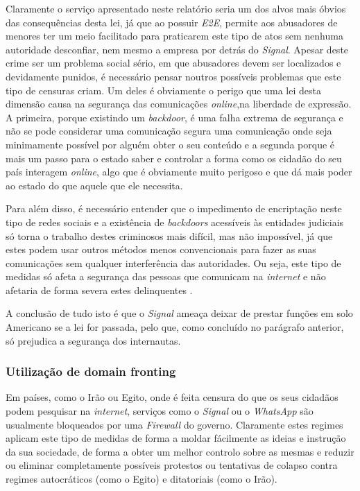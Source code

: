 Claramente o serviço apresentado neste relatório seria um dos alvos mais óbvios das consequências desta lei, já que ao possuir \textit{E2E}, permite aos abusadores de menores ter um meio facilitado para praticarem este tipo de atos sem nenhuma autoridade desconfiar, nem mesmo a empresa por detrás do \textit{Signal}. Apesar deste crime ser um problema social sério, em que abusadores devem ser localizados e devidamente punidos, é necessário pensar noutros possíveis problemas que este tipo de censuras criam. Um deles é obviamente o perigo que uma lei desta dimensão causa na segurança das comunicações \textit{online},na liberdade de expressão. A primeira, porque existindo um \textit{backdoor}, é uma falha extrema de segurança e não se pode considerar uma comunicação segura uma comunicação onde seja minimamente possível por alguém obter o seu conteúdo e a segunda porque é mais um passo para o estado saber e controlar a forma como os cidadão do seu país interagem \textit{online}, algo que é obviamente muito perigoso e que dá mais poder ao estado do que aquele que ele necessita.

Para além disso, é necessário entender que o impedimento de encriptação neste tipo de redes sociais e a existência de \textit{backdoors} acessíveis às entidades judiciais só torna o trabalho destes criminosos mais difícil, mas não impossível, já que estes podem usar outros métodos menos convencionais para fazer as suas comunicações sem qualquer interferência das autoridades. Ou seja, este tipo de medidas só afeta a segurança das pessoas que comunicam na \textit{internet} e não afetaria de forma severa estes delinquentes \cite{sigan_blog_earn_it}.

A conclusão de tudo isto é que o \textit{Signal} ameaça deixar de prestar funções em solo Americano se a lei for passada, pelo que, como concluído no parágrafo anterior, só prejudica a segurança dos internautas.

\subsubsection{Utilização de domain fronting}
Em países, como o Irão ou Egito, onde é feita censura do que os seus cidadãos podem pesquisar na \textit{internet}, serviços como o \textit{Signal} ou o \textit{WhatsApp} são usualmente bloqueados por uma \textit{Firewall} do governo. Claramente estes regimes aplicam este tipo de medidas de forma a moldar fácilmente as ideias e instrução da sua sociedade, de forma a obter um melhor controlo sobre as mesmas e reduzir ou eliminar completamente possíveis protestos ou tentativas de colapso contra regimes autocráticos (como o Egito) e ditatoriais (como o Irão). 

